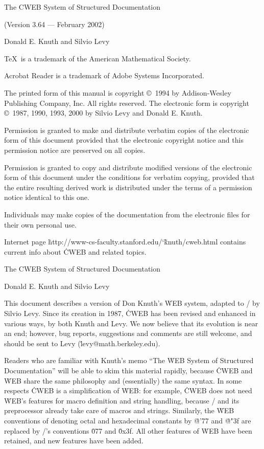 \null\vfill
\centerline{\titlefont The {\ttitlefont CWEB} System of
    Structured Documentation}
\vskip 18pt\centerline{(Version 3.64 --- February 2002)}
\vskip 24pt
\centerline{\authorfont Donald E. Knuth and Silvio Levy}
\vfill

\noindent
\TeX\ is a trademark of the American Mathematical Society.

\noindent
Acrobat Reader is a trademark of Adobe Systems Incorporated.

\bigskip\noindent
The printed form of this manual is copyright \copyright\ 1994
  by Addison-Wesley Publishing Company, Inc.  All rights reserved.
\smallskip\noindent
The electronic form is copyright \copyright\ 1987, 1990, 1993, 2000
  by Silvio Levy and Donald E. Knuth.

\bigskip\noindent
Permission is granted to make and distribute verbatim copies of the
electronic form of this document provided that the electronic copyright
notice and this permission notice are preserved on all copies.

\smallskip\noindent
Permission is granted to copy and distribute modified versions of the
electronic form of this document under the conditions for verbatim copying,
provided that the entire resulting derived work is distributed under the terms
of a permission notice identical to this one.

\smallskip\noindent
Individuals may make copies of the documentation from the electronic files
for their own personal use.

\smallskip\noindent
Internet page \.{http://www-cs-faculty.stanford.edu/\char`\~knuth/cweb.html}
contains current info about \.{CWEB} and related topics.

 \titletrue\eject\null\vfill\titletrue\eject{}

\titletrue
\centerline{\titlefont The {\ttitlefont CWEB} System of
    Structured Documentation}

\centerline{\authorfont Donald E. Knuth and Silvio Levy}

\noindent
This document describes a version of Don Knuth's \.{WEB} system,
adapted to \CEE/ by Silvio Levy.  Since its creation in 1987, \.{CWEB}
has been revised and enhanced in various ways, by both Knuth and Levy.
We now believe that its evolution is near an end; however, bug
reports, suggestions and comments are still welcome, and
should be sent to Levy (\.{levy@math.berkeley.edu}).

Readers who are familiar with Knuth's memo ``The \.{WEB} System of Structured
Documentation'' will be able
to skim this material rapidly, because \.{CWEB} and \.{WEB} share
the same philosophy and (essentially) the same syntax.  In some respects
\.{CWEB} is a simplification
of \.{WEB}: for example, \.{CWEB} does not need \.{WEB}'s features
for macro definition and string handling, because \CEE/ and its
preprocessor already take care of macros and strings. Similarly, the \.{WEB}
conventions of denoting octal and hexadecimal constants by \.{@'77}
and \.{@"3f} are replaced by \CEE/'s conventions \.{077} and
\.{0x3f}. All other features of \.{WEB} have been
retained, and new features have been added.

